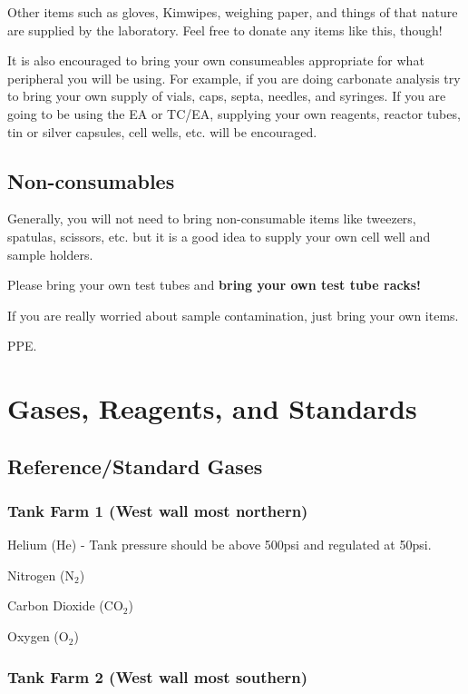 \documentclass[12pt]{../SOP3_beta}\usepackage[]{graphicx}\usepackage[]{color}
\begin{document}
\NP Other items such as gloves, Kimwipes, weighing paper, and things of that nature are supplied by the laboratory. Feel free to donate any items like this, though!

\NP It is also encouraged to bring your own consumeables appropriate for what peripheral you will be using. For example, if you are doing carbonate analysis try to bring your own supply of vials, caps, septa, needles, and syringes. If you are going to be using the EA or TC/EA, supplying your own reagents, reactor tubes, tin or silver capsules, cell wells, etc. will be encouraged.

\subsection{Non-consumables}

\NP Generally, you will not need to bring non-consumable items like tweezers, spatulas, scissors, etc. but it is a good idea to supply your own cell well and sample holders.

\NP Please bring your own test tubes and \textbf{bring your own test tube racks!}

\NP If you are really worried about sample contamination, just bring your own items.

\NP PPE.

\section{Gases, Reagents, and Standards}

\subsection{Reference/Standard Gases}

\subsubsection{Tank Farm 1 (West wall most northern)}

\NP Helium (He) - Tank pressure should be above 500psi and regulated at 50psi.

\NP Nitrogen (N$_2$)

\NP Carbon Dioxide (CO$_2$)

\NP Oxygen (O$_2$)

\subsubsection{Tank Farm 2 (West wall most southern)}
\end{document}

